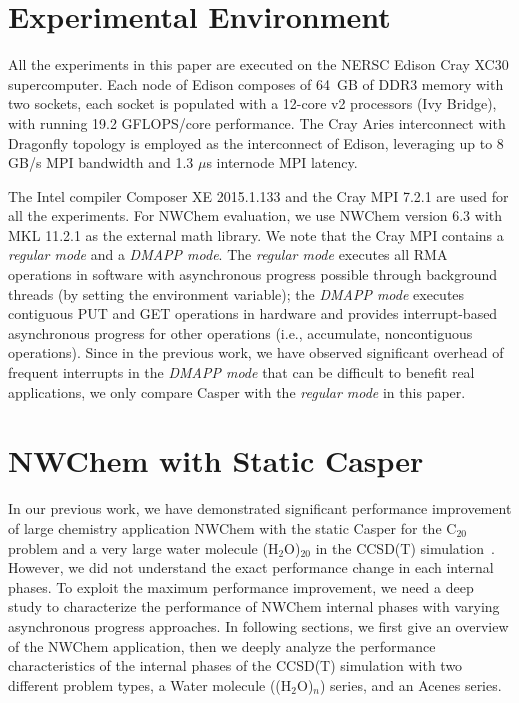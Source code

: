 \section{Experimental Environment}\label{sec:eva-env}

All the experiments in this paper are executed on the NERSC Edison
Cray XC30 supercomputer. Each node of Edison composes of 64~GB of DDR3
memory with two sockets, each socket is populated with a 12-core
v2 processors (Ivy Bridge), with running 19.2 GFLOPS\slash core performance.
The Cray Aries interconnect with Dragonfly topology is employed as the
interconnect of Edison, leveraging up to 8 GB\slash s MPI bandwidth
and 1.3 $\mu$s internode MPI latency.

The Intel compiler Composer XE 2015.1.133 and the Cray MPI 7.2.1 are used
for all the experiments. For NWChem evaluation, we use NWChem version 6.3
with MKL 11.2.1 as the external math library. We note that the Cray MPI
contains a {\em regular mode} and a {\em DMAPP mode}.
The {\em regular mode} executes all RMA operations in software with
asynchronous progress possible through background threads (by setting
the  environment variable); the {\em DMAPP mode}
executes contiguous PUT and GET operations in hardware and provides
interrupt-based asynchronous progress for other operations (i.e., accumulate,
noncontiguous operations).
Since in the previous work, we have observed significant overhead of
frequent interrupts in the {\em DMAPP mode} that can be difficult to
benefit real applications, we only compare Casper with the {\em regular mode}
in this paper.


\section{NWChem with Static Casper}\label{sec:eva-nwchem}
In our previous work, we have demonstrated significant performance
improvement of large chemistry application NWChem with the static Casper
for the C$_{20}$ problem and a very large water molecule (H$_2$O)$_{20}$
in the CCSD(T) simulation~\cite{casper}\cite{casper-scaling}. However,
we did not understand the exact performance change in each internal
phases. To exploit the maximum performance improvement, we need a deep
study to characterize the performance of NWChem internal phases with
varying asynchronous progress approaches.
In following sections, we first give an overview of the NWChem application,
then we deeply analyze the performance characteristics of the internal
phases of the CCSD(T) simulation with two different problem types, a
Water molecule ((H$_2$O)$_n $) series, and an Acenes series.

